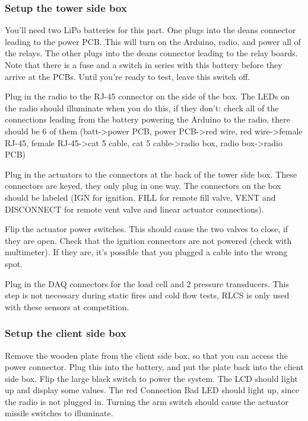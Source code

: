 \documentclass[11pt]{article}
\begin{document}
\subsubsection{Setup the tower side box}
\label{sec:orge7eb44f}
You'll need two LiPo batteries for this part. One plugs into the deans connector
leading to the power PCB. This will turn on the Arduino, radio, and power all of
the relays. The other plugs into the deans connector leading to the relay
boards. Note that there is a fuse and a switch in series with this battery
before they arrive at the PCBs. Until you're ready to test, leave this switch
off.

Plug in the radio to the RJ-45 connector on the side of the box. The LEDs on the
radio should illuminate when you do this, if they don't: check all of the
connections leading from the battery powering the Arduino to the radio, there
should be 6 of them (batt->power PCB, power PCB->red wire, red wire->female
RJ-45, female RJ-45->cat 5 cable, cat 5 cable->radio box, radio box->radio PCB)

Plug in the actuators to the connectors at the back of the tower side box. These
connectors are keyed, they only plug in one way. The connectors on the box
should be labeled (IGN for ignition, FILL for remote fill valve, VENT and
DISCONNECT for remote vent valve and linear actuator connections).

Flip the actuator power switches. This should cause the two valves to close, if
they are open. Check that the ignition connectors are not powered (check with
multimeter). If they are, it's possible that you plugged a cable into the wrong
spot.

Plug in the DAQ connectors for the load cell and 2 pressure transducers. This
step is not necessary during static fires and cold flow tests, RLCS is only used
with these sensors at competition.

\subsubsection{Setup the client side box}
\label{sec:org1aa15e6}

Remove the wooden plate from the client side box, so that you can access the
power connector. Plug this into the battery, and put the plate back into the
client side box. Flip the large black switch to power the system. The LCD should
light up and display some values. The red Connection Bad LED should light up,
since the radio is not plugged in. Turning the arm switch should cause the
actuator missile switches to illuminate.
\end{document}

